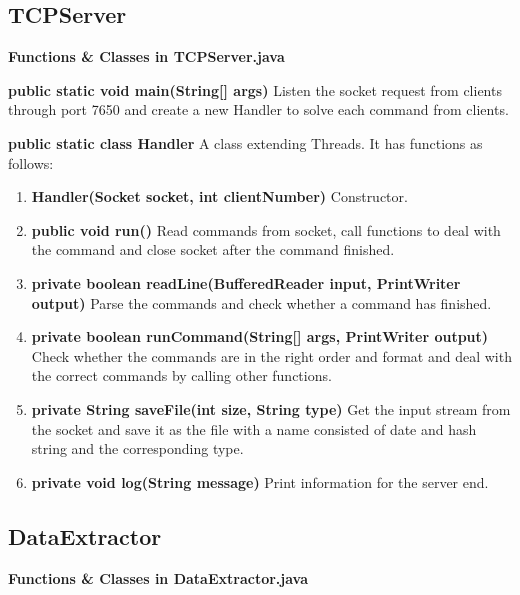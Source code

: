 \documentclass[a4paper,12pt]{article}
\begin{document}
	\subsection{TCPServer}
	\noindent\textbf{Functions \& Classes in TCPServer.java}
	
	\noindent\textbf{public static void main(String[] args)} Listen the socket request from clients through port 7650 and create a new Handler to solve each command from clients. 
	
	\noindent\textbf{public static class Handler} A class extending Threads. It has functions as follows:
	\begin{enumerate}
		\item \textbf{Handler(Socket socket, int clientNumber)} Constructor.
		\item \textbf{public void run()} Read commands from socket, call functions to deal with the command and close socket after the command finished.
		\item \textbf{private boolean readLine(BufferedReader input, PrintWriter output)} Parse the commands and check whether a command has finished.
		\item \textbf{private boolean runCommand(String[] args, PrintWriter output)} Check whether the commands are in the right order and format and deal with the correct commands by calling other functions.
		\item \textbf{private String saveFile(int size, String type)} Get the input stream from the socket and save it as the file with a name consisted of date and hash string and the corresponding type. 
		\item \textbf{private void log(String message)} Print information for the server end.
	\end{enumerate}
	
	\subsection{DataExtractor}
	\noindent\textbf{Functions \& Classes in DataExtractor.java}
	
\end{document}
